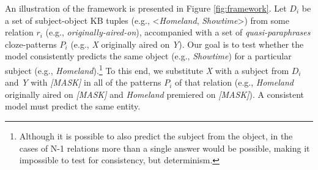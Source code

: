 An illustration of the framework is presented in Figure \ref{fig:framework}.
Let $D_i$ be a set of subject-object KB tuples (e.g., <\textit{Homeland}, \textit{Showtime}>) from some relation $r_i$ (e.g., \textit{originally-aired-on}), accompanied with a set of \textit{quasi-paraphrases} cloze-patterns $P_i$ (e.g., \textit{X} originally aired on \textit{Y}).
Our goal is to test whether the model consistently predicts the same object (e.g., \textit{Showtime}) for a particular subject (e.g., \textit{Homeland}).\footnote{Although it is possible to also predict the subject from the object, in the cases of N-1 relations more than a single answer would be possible, making it impossible to test for consistency, but determinism.} To this end, we substitute \textit{X} with a subject from $D_i$ and \textit{Y} with \textit{[MASK]} in all of the patterns $P_i$ of that relation (e.g., \textit{Homeland} originally aired on \textit{[MASK]} and \textit{Homeland} premiered on \textit{[MASK]}).
A consistent model must predict the same entity. 













